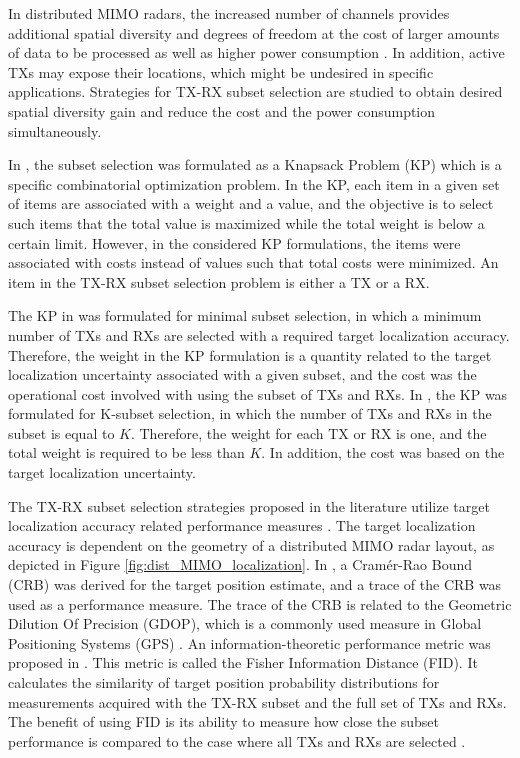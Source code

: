 \documentclass[english, 12pt, a4paper, elec, utf8, a-1b, online]{aaltothesis}
\numberwithin{equation}{section}
\begin{document}
In distributed MIMO radars, the increased number of channels provides additional spatial diversity and degrees of freedom at the cost of larger amounts of data to be processed as well as higher power consumption \cite{Haimovich2008}.
In addition, active TXs may expose their locations, which might be undesired in specific applications.
Strategies for TX-RX subset selection are studied to obtain desired spatial diversity gain and reduce the cost and the power consumption simultaneously.

In \cite{Godrich2011a, Godrich2011}, the subset selection was formulated as a Knapsack
Problem (KP) which is a specific combinatorial optimization problem.
In the KP, each item in a given set of items are associated with a weight and a value, and the objective is to select such items that the total value is maximized while the total weight is below a certain limit.
However, in the considered KP formulations, the items were associated with costs instead of values such that total costs were minimized.
An item in the TX-RX subset selection problem is either a TX or a RX.

The KP in \cite{Godrich2011a} was formulated for minimal subset selection, in which a minimum number of TXs and RXs are selected with a required target localization accuracy.
Therefore, the weight in the KP formulation is a quantity related to the target localization uncertainty associated with a given subset, and the cost was the operational cost involved with using the subset of TXs and RXs.
In \cite{Godrich2011}, the KP was formulated for K-subset selection, in which the number of TXs and RXs in the subset is equal to $K$.
Therefore, the weight for each TX or RX is one, and the total weight is required to be less than $K$.
In addition, the cost was based on the target localization uncertainty.

The TX-RX subset selection strategies proposed in the literature utilize target localization accuracy related performance measures \cite{Godrich2011a, Godrich2011, Sun2014}.
The target localization accuracy is dependent on the geometry of a distributed MIMO radar layout, as depicted in Figure \ref{fig:dist_MIMO_localization}.
In \cite{Godrich2011a, Godrich2011}, a Cram\'er-Rao Bound (CRB) was derived for the target position estimate, and a trace of the CRB was used as a performance measure.
The trace of the CRB is related to the Geometric Dilution Of Precision (GDOP), which is a commonly used measure in Global Positioning Systems (GPS) \cite{Sun2014}. 
An information-theoretic performance metric was proposed in \cite{Sun2014}.
This metric is called the Fisher Information Distance (FID). 
It calculates the similarity of target position probability distributions for measurements acquired with the TX-RX subset and the full set of TXs and RXs. 
The benefit of using FID is its ability to measure how close the subset performance is compared to the case where all TXs and RXs are selected \cite{Sun2014}.
\end{document}
